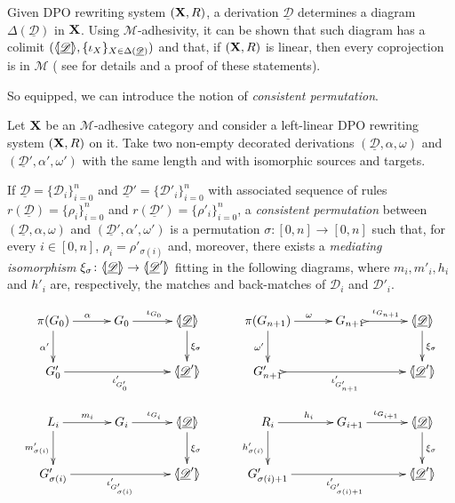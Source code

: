 \documentclass[a4paper,UKenglish,cleveref,pdftex, thm-restate,numberwithinsect,anonymous]{lipics}
\def\R{\mathsf{R}}
\def\X{\textbf {\textup{X}}}
\def\G{\textbf {\textup{G}}}
\newcommand{\dder}[1]{\mathscr{#1}}
\newcommand{\der}[1]{\underline{\dder{#1}}}
\newcommand{\lpro}{\langle \hspace{-1.85pt}[}
\newcommand{\rpro}{]\hspace{-1.85pt}\rangle}
\newcommand{\tpro}[1]{\lpro \der{#1}\rpro}
\begin{document}
Given DPO rewriting system $(\X, \R)$,  a derivation $\der{D}$ determines a diagram
$\Delta(\der{D})$ in $\X$. Using $\mathcal{M}$-adhesivity, it can be shown  that such diagram has a colimit $(\tpro{D}, \{\iota_X\}_{X\in \Delta(\der{D})})$ and that, if $(\X, \R)$ is linear, then every coprojection is in $\mathcal{M}$ ( see  for details and a proof of these statements).


So equipped, we can introduce the notion of \emph{consistent permutation}.

\begin{definition}
  \label{def:permcon}
  Let $\X$ be an $\mathcal{M}$-adhesive category and consider a
  left-linear DPO rewriting system $(\X, \R)$ on it.  Take two
  non-empty decorated derivations $(\der{D}, \alpha, \omega)$ and
  $(\der{D}', \alpha', \omega')$ with the same length and with
  isomorphic sources and targets.

  If $\der{D}=\{\dder{D}_i\}_{i=0}^n$ and
  $\der{D}'=\{\dder{D}'_i\}_{i=0}^n$ with associated sequence of rules
  $r(\der{D})=\{\rho_i\}_{i=0}^n$ and
  $r(\der{D}')=\{\rho'_i\}_{i=0}^n$, a \emph{consistent permutation}
  between $(\der{D}, \alpha, \omega)$ and
  $(\der{D}', \alpha', \omega')$ is a permutation
  $\sigma\colon [0,n]\to [0,n]$ such that, for every $i\in [0,n]$,
  $\rho_i=\rho'_{\sigma(i)}$ and, moreover, there exists a
  \emph{mediating isomorphism}
  $\xi_\sigma\colon \tpro{D} \to \lpro \der{D}' \rpro$ fitting in the
  following diagrams, where $m_i, m'_i, h_i$ and $h'_i$ are,
  respectively, the matches and back-matches of $\dder{D}_i$ and
  $\dder{D}'_i$.

  \[
    \xymatrix@C=30pt{\pi(G_0)\ar[r]^{\alpha} \ar[d]_{\alpha'} & G_0
      \ar[r]^{\iota_{G_0}} &\tpro{D} \ar[d]^{\xi_\sigma}& \pi(G_{n+1})
      \ar[r]^{\omega} \ar[d]_{\omega'} & G_{n+1}
      \ar@{>->}[r]^{\iota_{G_{n+1}}} &\tpro{D} \ar[d]^{\xi_\sigma}\\
      G'_0 \ar[rr]_{\iota'_{G'_0}} & &\lpro \der{D}' \rpro& G'_{n+1}
      \ar@{>->}[rr]_{\iota'_{G'_{n+1}}} & &\lpro \der{D}' \rpro\\L_i
      \ar[r]^{m_i} \ar[d]_{m'_{\sigma(i)}}& G_i \ar[r]^{\iota_{G_i}}
      &\tpro{D} \ar[d]^{\xi_\sigma} & R_i \ar[r]^{h_i}
      \ar[d]_{h'_{\sigma(i)}}& G_{i+1} \ar[r]^{\iota_{G_{i+1}}}
      &\tpro{D} \ar[d]^{\xi_\sigma} \\G'_{\sigma(i)}
      \ar[rr]_{\iota'_{G'_{\sigma(i)}}}&& \lpro \der{D}' \rpro&
      G'_{\sigma(i)+1} \ar[rr]_{\iota'_{G'_{\sigma(i)+1}}}&& \lpro
      \der{D}' \rpro}
  \]
\end{definition}
\end{document}
